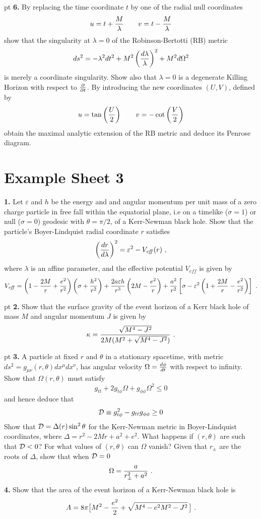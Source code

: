  pt 
\noindent 
{\bf 6.} By replacing the time coordinate $t$
by one of the radial null coordinates
$$
u= t+ {M\over \lambda} \qquad v= t- {M\over \lambda}
$$
show that the singularity at $\lambda=0$ of the Robinson-Bertotti (RB)
metric
$$
ds^2 = -\lambda^2 dt^2 + M^2 \left({d\lambda\over \lambda}\right)^2 +
M^2 d\Omega^2 
$$
is merely a coordinate singularity.
Show also that $\lambda=0$ is a degenerate Killing Horizon with respect
to $\partial\over \partial t$. By
introducing the new coordinates $(U,V)$, defined by
$$
u= \tan \left({U\over 2}\right)\qquad v=-\cot \left({V\over2}\right)
$$
obtain the maximal analytic extension of the RB metric and deduce its
Penrose diagram.

\vfill\eject

\section{Example Sheet 3}

\noindent 
{\bf 1.} Let $\varepsilon$ and $h$ be the energy and and angular
momentum per unit mass of a zero charge particle in free fall
within the equatorial plane, i.e on a timelike ($\sigma=1$) or null
($\sigma=0$) geodesic with $\theta=\pi/2$, of a Kerr-Newman black hole.
Show that the particle's Boyer-Lindquist radial coordinate $r$
satisfies   
$$ 
\left({dr\over d\lambda}\right)^2 =\varepsilon^2 - V_{\mathit{eff}}(r)\ ,
$$ 
where $\lambda$ is an affine parameter, and the effective potential
$V_{\mathit{eff}}$ is given by $$ 
V_{\mathit{eff}} =
\left(1-{2M\over r}+{e^2\over r^2}\right)\left(\sigma + {h^2\over
r^2}\right) + {2a\varepsilon h\over r^3}\left( 2M -{e^2\over r}\right)
+{a^2\over r^2}\left[\sigma-\varepsilon^2\left(1+{2M\over r}-{e^2\over
r^2}\right)\right] \ .
$$

 pt 
\noindent 
{\bf 2.} Show that the surface gravity of the event horizon of a Kerr
black hole of mass $M$ and angular momentum $J$ is given by
$$
\kappa = {\sqrt{M^4 -J^2}\over 2M( M^2 + \sqrt{M^4 -J^2})}\ .
$$

 pt 
\noindent 
{\bf 3.} A particle at fixed $r$ and $\theta$ in a stationary
spacetime, with metric $ds^2= g_{\mu\nu}(r,\theta)dx^\mu dx^\nu$, has
angular velocity $\Omega= {d\phi\over dt}$ with respect to infinity.
Show that $\Omega(r,\theta)$ must satisfy
$$
g_{tt} + 2g_{t\phi}\Omega + g_{\phi\phi}\Omega^2 \le 0
$$
and hence deduce that
$$
{\cal D}\equiv g_{t\phi}^2 - g_{tt}g_{\phi\phi} \ge 0
$$
Show that ${\cal D}=\Delta (r) \sin^2\theta$ for the Kerr-Newman 
metric in Boyer-Lindquist coordinates, where $\Delta= r^2-2Mr+a^2+e^2$.
What happens if $(r,\theta)$ are such that ${\cal D}<0$? For what
values of $(r,\theta)$ can $\Omega$ vanish? Given that $r_{\pm}$ are the 
roots of $\Delta$, show that when ${\cal D}=0$  
$$ 
\Omega = {a\over r_{\pm}^2 +a^2} \ .
$$
\vskip 10pt
\noindent
{\bf 4.} Show that the area of the event horizon of a Kerr-Newman
black hole is
$$
A= 8\pi\big[ M^2 - {e^2\over2} + \sqrt{ M^4 -e^2 M^2 -J^2 }\,\big]\ .
$$

